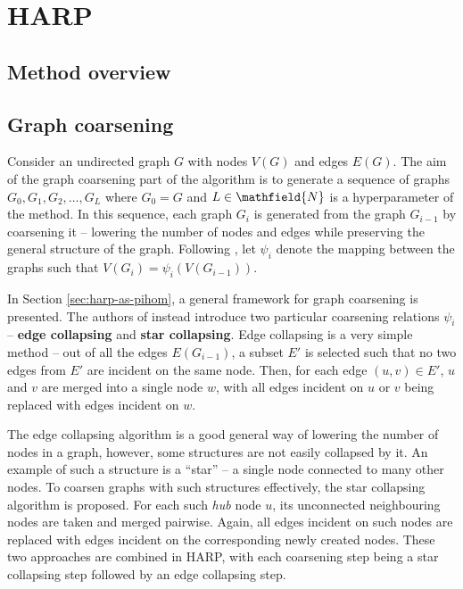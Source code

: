 \section{HARP}\label{sec:harp}

\subsection{Method overview}

\subsection{Graph coarsening}\label{sec:graph-coarsening}
\sloppy Consider an undirected graph \( G \) with nodes \( V \left( G \right) \) and edges \( E \left( G \right) \). The aim of the graph coarsening part of the algorithm is to generate a sequence of graphs \( G_0, G_1, G_2, \dots, G_L \) where \( G_0 = G \) and \( L \in \mathfield{N} \) is a hyperparameter of the method. In this sequence, each graph \( G_i \) is generated from the graph \( G_{i - 1} \) by coarsening it -- lowering the number of nodes and edges while preserving the general structure of the graph. Following \cite{chen_harp_2018}, let \( \psi_i \) denote the mapping between the graphs such that \( V \left( G_i \right) = \psi_i \left( V \left( G_{i - 1} \right) \right) \).

In Section \ref{sec:harp-as-pihom}, a general framework for graph coarsening is presented. The authors of \cite{chen_harp_2018} instead introduce two particular coarsening relations \( \psi_i \) -- \textbf{edge collapsing} and \textbf{star collapsing}. Edge collapsing is a very simple method -- out of all the edges \( E \left( G_{i - 1} \right) \), a subset \( E' \) is selected such that no two edges from \( E' \) are incident on the same node. Then, for each edge \( \left( u, v \right) \in E' \), \( u \) and \( v \) are merged into a single node \( w \), with all edges incident on \( u \) or \( v \) being replaced with edges incident on \( w \).

The edge collapsing algorithm is a good general way of lowering the number of nodes in a graph, however, some structures are not easily collapsed by it. An example of such a structure is a \enquote{star} -- a single node connected to many other nodes. To coarsen graphs with such structures effectively, the star collapsing algorithm is proposed. For each such \textit{hub} node \( u \), its unconnected neighbouring nodes are taken and merged pairwise. Again, all edges incident on such nodes are replaced with edges incident on the corresponding newly created nodes. These two approaches are combined in HARP, with each coarsening step being a star collapsing step followed by an edge collapsing step.


